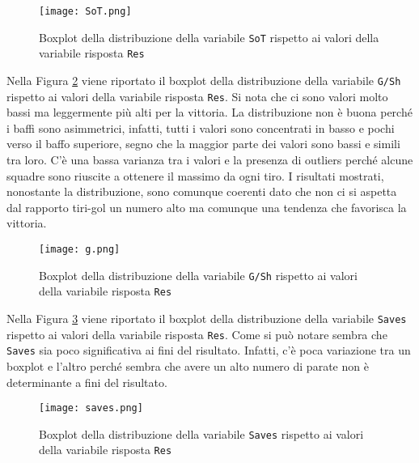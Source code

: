 \begin{figure}[htbp]
	\begin{center}
		\texttt{[image: SoT.png]}
		\caption{Boxplot della distribuzione della variabile \texttt{SoT} rispetto ai valori della variabile risposta \texttt{Res} } \label{fig:sot}
	\end{center}
\end{figure}
Nella Figura \ref{fig:g} viene riportato il boxplot della distribuzione della variabile \texttt{G/Sh} rispetto ai valori della variabile risposta \texttt{Res}. Si nota che ci sono valori molto bassi ma leggermente più alti per la vittoria. La distribuzione non è buona perché i baffi sono asimmetrici, infatti, tutti i valori sono concentrati in basso e pochi verso il baffo superiore, segno che la maggior parte dei valori sono bassi e simili tra loro. C'è una bassa varianza tra i valori e la presenza di outliers perché alcune squadre sono riuscite a ottenere il massimo da ogni tiro. I risultati mostrati, nonostante la distribuzione, sono comunque coerenti dato che non ci si aspetta dal rapporto tiri-gol un numero alto ma comunque una tendenza che favorisca la vittoria.\\
\begin{figure}[htbp]
	\begin{center}
		\texttt{[image: g.png]}
		\caption{Boxplot della distribuzione della variabile \texttt{G/Sh} rispetto ai valori della variabile risposta \texttt{Res} } \label{fig:g}
	\end{center}
\end{figure}
Nella Figura \ref{fig:saves} viene riportato il boxplot della distribuzione della variabile \texttt{Saves} rispetto ai valori della variabile risposta \texttt{Res}. Come si può notare sembra che \texttt{Saves} sia poco significativa ai fini del risultato. Infatti, c'è poca variazione tra un boxplot e l'altro perché sembra che avere un alto numero di parate non è determinante a fini del risultato.\\
\begin{figure}[htbp]
	\begin{center}
		\texttt{[image: saves.png]}
		\caption{Boxplot della distribuzione della variabile \texttt{Saves} rispetto ai valori della variabile risposta \texttt{Res} } \label{fig:saves}
	\end{center}
\end{figure}
